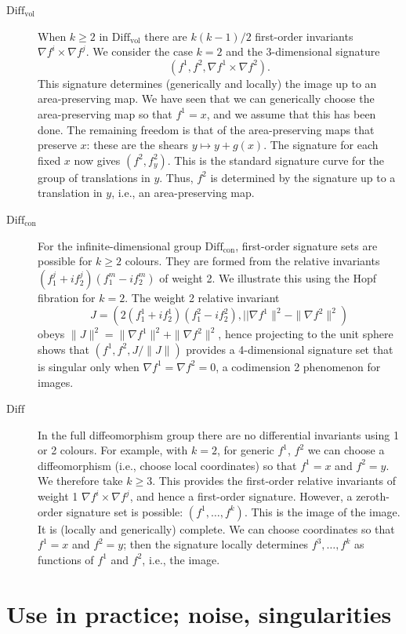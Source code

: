 \documentclass[review,onefignum,onetabnum]{siamonline190516}
\begin{document}
{\begin{description}
\item[$\mathrm{Diff}_{\mathrm{vol}}$]
When $k\ge 2$ in $\mathrm{Diff}_{\mathrm{vol}}$ there are $k(k-1)/2$ first-order invariants $ \nabla f^i \times \nabla f^j$.  We consider the case $k=2$ and the 3-dimensional signature $$ (f^1,f^2, \nabla f^1 \times \nabla f^2).$$ This signature determines (generically and locally) the image up to an area-preserving map.  We have seen that we can generically choose the area-preserving map so that $f^1=x$, and we assume that this has been done. The remaining freedom is that of the area-preserving maps that preserve $x$: these are the shears $y\mapsto y + g(x)$. The signature for each fixed $x$ now gives $(f^2,f^2_y)$. This is the standard signature curve for the group of translations in $y$. Thus, $f^2$ is determined by the signature up to a translation in $y$, i.e., an area-preserving map.
\item[$\mathrm{Diff}_{\mathrm{con}}$]
For the infinite-dimensional group $\mathrm{Diff}_{\mathrm{con}}$, first-order signature sets are possible for $k \ge 2$ colours. They are formed from the relative invariants $(f^j_1 + i f^j_2)(f^m_1 - i f^m_2)$ of weight 2. We illustrate this using the Hopf fibration for $k=2$. The weight 2 relative invariant $$J = (2(f^1_1 + i f^1_2)(f^2_1 - i f^2_2), ||\nabla f^1\|^2 - \|\nabla f^2\|^2)$$ obeys $\|J\|^2 = \|\nabla f^1\|^2 + \|\nabla f^2\|^2$, hence projecting to the unit sphere shows that $(f^1,f^2,J/\|J\|)$ provides a 4-dimensional signature set that is singular only when $\nabla f^1 = \nabla f^2 = 0$, a codimension 2 phenomenon for images.
\item[$\mathrm{Diff}$]
In the full diffeomorphism group there are no differential invariants using 1 or 2 colours. For example, with $k=2$, for generic $f^1$, $f^2$ we can choose a diffeomorphism (i.e., choose local coordinates) so that $f^1=x$ and $f^2=y$. We therefore take $k\ge 3$. This provides the first-order relative invariants of weight 1 $\nabla f^i\times \nabla f^j$, and hence a first-order signature. However, a zeroth-order signature set is possible: $(f^1,\dots,f^k)$. This is the image of the image. It is (locally and generically) complete. We can choose coordinates so that $f^1=x$ and $f^2=y$; then the signature locally determines $f^3,\dots,f^k$ as functions of $f^1$ and $f^2$, i.e., the image.
\end{description}



\section{Use in practice; noise, singularities}

}
\end{document}
